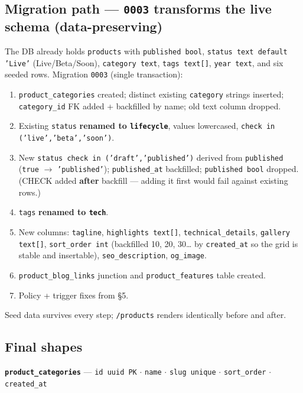 \documentclass[11pt,a4paper]{article}
\begin{document}
\subsection{Migration path --- \texttt{0003} transforms the live schema (data-preserving)}
The DB already holds \texttt{products} with \texttt{published bool}, \texttt{status text
default 'Live'} (Live/Beta/Soon), \texttt{category text}, \texttt{tags text[]},
\texttt{year text}, and six seeded rows. Migration \texttt{0003} (single transaction):
\begin{enumerate}
  \item \texttt{product\_categories} created; distinct existing \texttt{category} strings
        inserted; \texttt{category\_id} FK added + backfilled by name; old text column dropped.
  \item Existing \texttt{status} \textbf{renamed to \texttt{lifecycle}}, values lowercased,
        \texttt{check in ('live','beta','soon')}.
  \item New \texttt{status check in ('draft','published')} derived from \texttt{published}
        (\texttt{true} $\rightarrow$ \texttt{'published'}); \texttt{published\_at} backfilled;
        \texttt{published bool} dropped. (CHECK added \textbf{after} backfill --- adding it
        first would fail against existing rows.)
  \item \texttt{tags} \textbf{renamed to \texttt{tech}}.
  \item New columns: \texttt{tagline}, \texttt{highlights text[]},
        \texttt{technical\_details}, \texttt{gallery text[]}, \texttt{sort\_order int}
        (backfilled 10, 20, 30\ldots{} by \texttt{created\_at} so the grid is stable and
        insertable), \texttt{seo\_description}, \texttt{og\_image}.
  \item \texttt{product\_blog\_links} junction and \texttt{product\_features} table created.
  \item Policy + trigger fixes from \S5.
\end{enumerate}
Seed data survives every step; \texttt{/products} renders identically before and after.

\subsection{Final shapes}
\textbf{\texttt{product\_categories}} --- \texttt{id uuid PK} \(\cdot\) \texttt{name}
\(\cdot\) \texttt{slug unique} \(\cdot\) \texttt{sort\_order} \(\cdot\) \texttt{created\_at}
\end{document}
